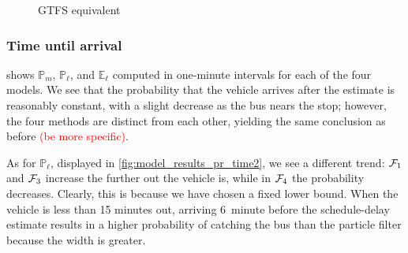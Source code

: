 \begin{knitrout}
\color{fgcolor}\begin{figure}
\newline
{}\caption[GTFS equivalent]{GTFS equivalent}\label{fig:model_results_pr_gtfs}
\end{figure}


\end{knitrout}


\subsubsection{Time until arrival}

 shows $\mathbb{P}_m$, $\mathbb{P}_\ell$, and $\mathbb{E}_\ell$ computed in one-minute intervals for each of the four models. We see that the probability that the vehicle arrives after the estimate is reasonably constant, with a slight decrease as the bus nears the stop; however, the four methods are distinct from each other, yielding the same conclusion as before \textcolor{red}{(be more specific)}.

As for $\mathbb{P}_\ell$, displayed in \cref{fig:model_results_pr_time2}, we see a different trend: $\mathcal{F}_1$ and $\mathcal{F}_3$ increase the further out the vehicle is, while in $\mathcal{F}_4$ the probability decreases. Clearly, this is because we have chosen a fixed lower bound. When the vehicle is less than 15 minutes out, arriving 6~minute before the schedule-delay estimate results in a higher probability of catching the bus than the particle filter because the width is greater.


